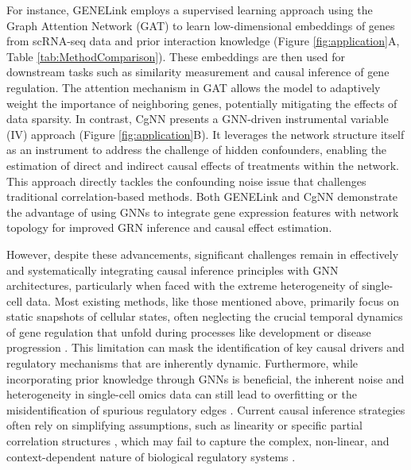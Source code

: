 For instance, GENELink \cite{chen2022graph} employs a supervised learning approach using the Graph Attention Network (GAT) to learn low-dimensional embeddings of genes from scRNA-seq data and prior interaction knowledge (Figure \ref{fig:application}A, Table \ref{tab:MethodComparison}). These embeddings are then used for downstream tasks such as similarity measurement and causal inference of gene regulation. The attention mechanism in GAT allows the model to adaptively weight the importance of neighboring genes, potentially mitigating the effects of data sparsity. In contrast, CgNN \cite{du2024causal} presents a GNN-driven instrumental variable (IV) approach (Figure \ref{fig:application}B). It leverages the network structure itself as an instrument to address the challenge of hidden confounders, enabling the estimation of direct and indirect causal effects of treatments within the network. This approach directly tackles the confounding noise issue that challenges traditional correlation-based methods. Both GENELink and CgNN demonstrate the advantage of using GNNs to integrate gene expression features with network topology for improved GRN inference and causal effect estimation.

However, despite these advancements, significant challenges remain in effectively and systematically integrating causal inference principles with GNN architectures, particularly when faced with the extreme heterogeneity of single-cell data. Most existing methods, like those mentioned above, primarily focus on static snapshots of cellular states, often neglecting the crucial temporal dynamics of gene regulation that unfold during processes like development or disease progression \cite{nguyen2021comprehensive,keil2024review}. This limitation can mask the identification of key causal drivers and regulatory mechanisms that are inherently dynamic. Furthermore, while incorporating prior knowledge through GNNs is beneficial, the inherent noise and heterogeneity in single-cell omics data can still lead to overfitting or the misidentification of spurious regulatory edges \cite{wang2023gene}. Current causal inference strategies often rely on simplifying assumptions, such as linearity or specific partial correlation structures \cite{tran2022scremote,badia2023gene,wen2023applying}, which may fail to capture the complex, non-linear, and context-dependent nature of biological regulatory systems \cite{shojaee2023robust,jereesh2024reconstruction,yazdani2020mendelianrandomizationcausalnetworks}.

